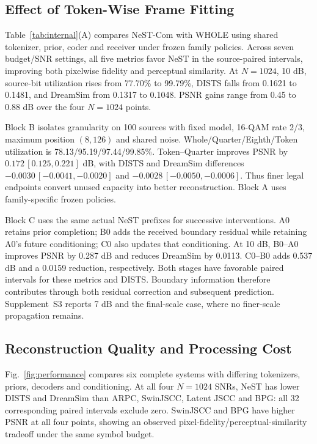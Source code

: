 
\ifCLASSOPTIONonecolumn\else\fi
\subsection{Effect of Token-Wise Frame Fitting}
Table~\ref{tab:internal}(A) compares NeST-Com with WHOLE using shared tokenizer, prior, coder and receiver under frozen family policies. Across seven budget/SNR settings, all five metrics favor NeST in the source-paired intervals, improving both pixelwise fidelity and perceptual similarity. At $N=1024$, 10 dB, source-bit utilization rises from 77.70\% to 99.79\%, DISTS falls from 0.1621 to 0.1481, and DreamSim from 0.1317 to 0.1048. PSNR gains range from 0.45 to 0.88 dB over the four $N=1024$ points.

Block B isolates granularity on 100 sources with fixed model, 16-QAM rate 2/3, maximum position $(8,126)$ and shared noise. Whole/Quarter/Eighth/Token utilization is 78.13/95.19/97.44/99.85\%. Token--Quarter improves PSNR by $0.172\,[0.125,0.221]$ dB, with DISTS and DreamSim differences $-0.0030\,[-0.0041,-0.0020]$ and $-0.0028\,[-0.0050,-0.0006]$. Thus finer legal endpoints convert unused capacity into better reconstruction. Block A uses family-specific frozen policies.

Block C uses the same actual NeST prefixes for successive interventions. A0 retains prior completion; B0 adds the received boundary residual while retaining A0's future conditioning; C0 also updates that conditioning. At 10 dB, B0--A0 improves PSNR by 0.287 dB and reduces DreamSim by 0.0113. C0--B0 adds 0.537 dB and a 0.0159 reduction, respectively. Both stages have favorable paired intervals for these metrics and DISTS. Boundary information therefore contributes through both residual correction and subsequent prediction. Supplement~S3 reports 7 dB and the final-scale case, where no finer-scale propagation remains.

\subsection{Reconstruction Quality and Processing Cost}
\ifCLASSOPTIONonecolumn\fi

Fig.~\ref{fig:performance} compares six complete systems with differing tokenizers, priors, decoders and conditioning. At all four $N=1024$ SNRs, NeST has lower DISTS and DreamSim than ARPC, SwinJSCC, Latent JSCC and BPG: all 32 corresponding paired intervals exclude zero. SwinJSCC and BPG have higher PSNR at all four points, showing an observed pixel-fidelity/perceptual-similarity tradeoff under the same symbol budget.

